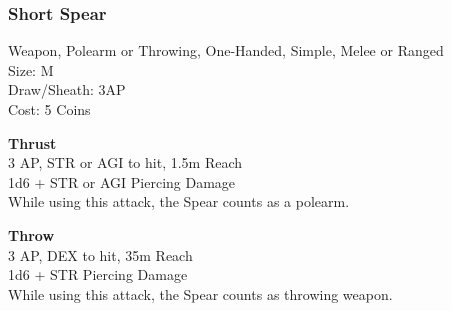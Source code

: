 \subsubsection{Short Spear}\label{weapon:shortSpear}
Weapon, Polearm or Throwing, One-Handed, Simple, Melee or Ranged\\
Size: M\\
Draw/Sheath: 3AP\\
Cost: 5 Coins

\textbf{Thrust}\\
3 AP, STR or AGI to hit, 1.5m Reach\\
1d6 + \texttimes STR or AGI Piercing Damage\\
While using this attack, the Spear counts as a polearm.

\textbf{Throw}\\
3 AP, DEX to hit, 35m Reach\\
1d6 + \texttimes STR Piercing Damage\\
While using this attack, the Spear counts as throwing weapon.

